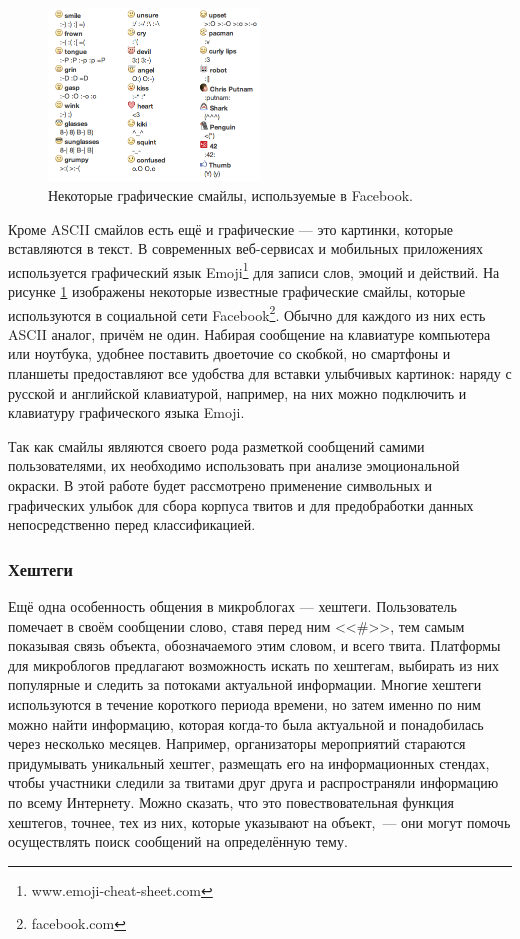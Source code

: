 \begin{figure}[h]
\centering
\includegraphics[width=0.5\textwidth]{ListofFacebookChatEmoji}
\caption{Некоторые графические смайлы, используемые в Facebook.}
\label{emoji}
\end{figure}

\pagebreak
Кроме ASCII смайлов есть ещё и графические --- это картинки, которые вставляются в текст. В
современных веб-сервисах и мобильных приложениях используется графический язык Emoji\footnote{www.emoji-cheat-sheet.com} для
записи слов, эмоций и действий. На рисунке \ref{emoji} изображены некоторые известные графические
смайлы, которые используются в социальной сети Facebook\footnote{facebook.com}. Обычно для
каждого из них есть ASCII аналог, причём не один. Набирая сообщение на клавиатуре компьютера или
ноутбука, удобнее поставить двоеточие со скобкой, но смартфоны и планшеты предоставляют все удобства
для вставки улыбчивых картинок: наряду с русской и английской клавиатурой, например, на них можно
подключить и клавиатуру графического языка Emoji.

Так как смайлы являются своего рода разметкой сообщений самими пользователями, их необходимо
использовать при анализе эмоциональной окраски. В этой работе будет рассмотрено применение
символьных и графических улыбок для сбора корпуса твитов и для предобработки данных непосредственно
перед классификацией.

\subsubsection{Хештеги}

Ещё одна особенность общения в микроблогах --- хештеги. Пользователь помечает в своём сообщении
слово, ставя перед ним <<\#>>, тем самым показывая связь объекта, обозначаемого этим словом, и всего
твита. Платформы для микроблогов предлагают возможность искать по хештегам, выбирать из них
популярные и следить за потоками актуальной информации. Многие хештеги используются в течение
короткого периода времени, но затем именно по ним можно найти информацию, которая когда-то была
актуальной и понадобилась через несколько месяцев. Например, организаторы мероприятий стараются
придумывать уникальный хештег, размещать его на информационных стендах, чтобы участники следили за
твитами друг друга и распространяли информацию по всему Интернету. Можно сказать, что это
повествовательная функция хештегов, точнее, тех из них, которые указывают на объект,~--- они могут
помочь осуществлять поиск сообщений на определённую тему.

